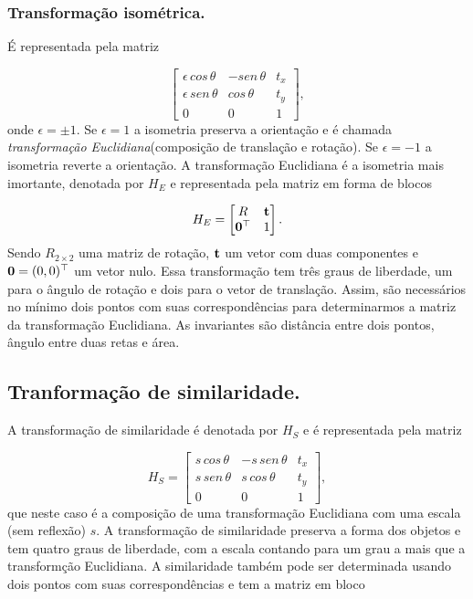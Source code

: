 \subsubsection*{Transformação isométrica.}
É representada pela matriz

\begin{equation*}
\begin{bmatrix}
\epsilon\,cos\,\theta&-sen\,\theta&t_x\\
\epsilon\,sen\,\theta&cos\,\theta&t_y\\
0&0&1
\end{bmatrix},
\end{equation*}
onde $\epsilon=\pm1$. Se $\epsilon=1$ a isometria preserva a orientação e é chamada \textit{transformação Euclidiana}(composição de translação e rotação). Se $\epsilon=-1$ a isometria reverte a orientação. A transformação Euclidiana é a isometria mais imortante, denotada por $H_E$ e representada pela matriz em forma de blocos

\begin{equation*}
H_E=
\begin{bmatrix}
R&{\bf t}\\
{\bf 0}^\top&1
\end{bmatrix}.
\end{equation*}
Sendo $R_{2\times2}$ uma matriz de rotação, ${\bf t}$ um vetor com duas componentes e ${\bf 0}=(0,0)^\top$ um vetor nulo. Essa transformação tem três graus de liberdade, um para o ângulo de rotação e dois para o vetor de translação. Assim, são necessários no mínimo dois pontos com suas correspondências para determinarmos a matriz da transformação Euclidiana. As invariantes são distância entre dois pontos, ângulo entre duas retas e área. 

\subsection*{Tranformação de similaridade.}
A transformação de similaridade é denotada por $H_S$ e é representada pela matriz 

\begin{equation*}
H_S=
\begin{bmatrix}
s\,cos\,\theta&-s\,sen\,\theta&t_x\\
s\,sen\,\theta&s\,cos\,\theta&t_y\\
0&0&1
\end{bmatrix},
\end{equation*} 
que neste caso é a composição de uma transformação Euclidiana com uma escala (sem reflexão) $s$. A transformação de similaridade preserva a forma dos objetos e tem quatro graus de liberdade, com a escala contando para um grau a mais que a transformção Euclidiana. A similaridade também pode ser determinada usando dois pontos com suas correspondências e tem a matriz em bloco

